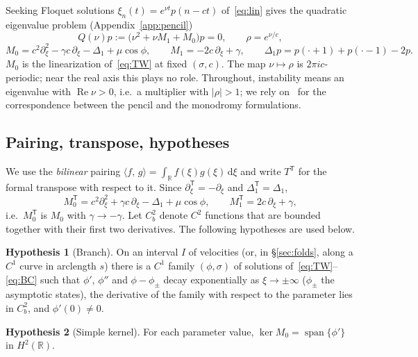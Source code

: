 \documentclass[11pt]{article}
\theoremstyle{plain}
\theoremstyle{definition}
\newtheorem{hypothesis}{Hypothesis}
\theoremstyle{remark}
\newcommand{\ip}[2]{\langle #1,\,#2\rangle}
\newcommand{\dd}{\mathrm{d}}
\newcommand{\R}{\mathbb{R}}
\newcommand{\T}{\mathsf T}
\begin{document}
Seeking Floquet solutions $\xi_n(t)=e^{\nu t}p(n-ct)$ of~\eqref{eq:lin} gives the quadratic
eigenvalue problem (Appendix~\ref{app:pencil})
\begin{equation}\label{eq:pencil}
  Q(\nu)p:=\bigl(\nu^2+\nu M_1+M_0\bigr)p=0,\qquad \rho=e^{\nu/c},
\end{equation}
\begin{equation}\label{eq:M0M1}
  M_0=c^2\partial_\xi^2-\gamma c\,\partial_\xi-\Delta_1+\mu\cos\phi,\qquad
  M_1=-2c\,\partial_\xi+\gamma,\qquad
  \Delta_1 p=p(\cdot+1)+p(\cdot-1)-2p .
\end{equation}
$M_0$ is the linearization of~\eqref{eq:TW} at fixed $(\sigma,c)$. The map $\nu\mapsto\rho$ is
$2\pi i c$-periodic; near the real axis this plays no role. Throughout, instability means an
eigenvalue with $\operatorname{Re}\nu>0$, i.e.\ a multiplier with $|\rho|>1$; we rely
on~\cite{CKVX17,XCKV18} for the correspondence between the pencil and the monodromy
formulations.

\subsection{Pairing, transpose, hypotheses}

We use the \emph{bilinear} pairing $\ip fg=\int_\R f(\xi)g(\xi)\,\dd\xi$ and write
$T^{\T}$ for the formal transpose with respect to it. Since
$\partial_\xi^{\T}=-\partial_\xi$ and $\Delta_1^{\T}=\Delta_1$,
\begin{equation}\label{eq:M0T}
  M_0^{\T}=c^2\partial_\xi^2+\gamma c\,\partial_\xi-\Delta_1+\mu\cos\phi,\qquad
  M_1^{\T}=2c\,\partial_\xi+\gamma,
\end{equation}
i.e.\ $M_0^{\T}$ is $M_0$ with $\gamma\to-\gamma$. Let $C^2_b$ denote $C^2$ functions that are
bounded together with their first two derivatives. The following hypotheses are used below.

\begin{hypothesis}[Branch]\label{H:branch}
On an interval $I$ of velocities (or, in \S\ref{sec:folds}, along a $C^1$ curve in
arclength $s$) there is a $C^1$ family $(\phi,\sigma)$ of solutions of~\eqref{eq:TW}--\eqref{eq:BC}
such that $\phi'$, $\phi''$ and $\phi-\phi_{\pm}$ decay exponentially as $\xi\to\pm\infty$
($\phi_\pm$ the asymptotic states), the derivative of the family with respect to the
parameter lies in $C^2_b$, and $\phi'(0)\neq0$.
\end{hypothesis}

\begin{hypothesis}[Simple kernel]\label{H:fredholm}
For each parameter value, $\ker M_0=\operatorname{span}\{\phi'\}$ in $H^2(\R)$.
\end{hypothesis}
\end{document}
